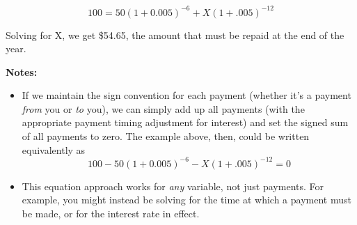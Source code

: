 \documentclass[14pt,twoside]{extarticle}
\begin{document}
\[
  100 = 50(1 + 0.005)^{-6} + X(1+.005)^{-12}
\]

Solving for X, we get \$54.65, the amount that must be repaid at the end of the year.

\vspace{.2in}
\textbf{Notes:}
\begin{itemize}

  \item If we maintain the sign convention for each payment (whether it's a payment \emph{from} you
        or \emph{to} you), we can simply add up all payments (with the appropriate payment timing
        adjustment for interest) and set the signed sum of all payments to zero. The example above,
        then, could be written equivalently as
        \[
          100 - 50(1 + 0.005)^{-6} - X(1+.005)^{-12} = 0
        \]

  \item This equation approach works for \emph{any} variable, not just payments.  For example, you might instead be solving for
        the time at which a payment must be made, or for the interest rate in effect.

\end{itemize}
\end{document}
